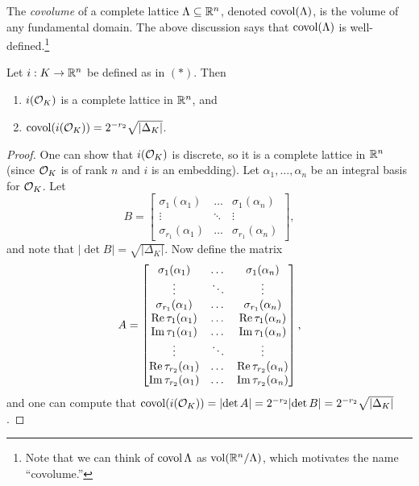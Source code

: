 \begin{definition}
  The \emph{covolume} of a complete lattice
  $\Lambda \subseteq \mathbb{R}^n$, denoted
  $\operatorname{covol}(\Lambda)$, is the volume of any fundamental
  domain. The above discussion says that $\operatorname{covol}(\Lambda)$
  is well-defined.\footnote{Note that we can think of $\operatorname{covol}{\Lambda}$ as $\operatorname{vol}(\mathbb{R}^n / \Lambda)$, which motivates the name ``covolume.''}
\end{definition}

\begin{theorem}
  Let $i : K \to \mathbb{R}^n$ be defined as in $(*)$. Then
  \begin{enumerate}
    \item $i(\mathcal{O}_K)$ is a complete lattice in $\mathbb{R}^n$, and
    \item $\operatorname{covol}(i(\mathcal{O}_K)) = 2^{-r_2} \sqrt{|\Delta_K|}$.
  \end{enumerate}
\end{theorem}

\begin{proof}
  One can show that $i(\mathcal{O}_K)$ is discrete, so
  it is a complete lattice in $\mathbb{R}^n$ (since $\mathcal{O}_K$ is
  of rank $n$ and $i$ is an embedding).
  Let $\alpha_1, \dots, \alpha_n$ be an integral
  basis for $\mathcal{O}_K$. Let
  \[
    B = \begin{bmatrix}
      \sigma_1(\alpha_1) & \dots & \sigma_1(\alpha_n) \\
      \vdots & \ddots & \vdots \\
      \sigma_{r_1}(\alpha_1) & \dots & \sigma_{r_1}(\alpha_n)
    \end{bmatrix},
  \]
  and note that $|{\det B}| = \sqrt{|\Delta_K|}$.
  Now define the matrix
  \[
    A = \begin{bmatrix}
      \sigma_1(\alpha_1) & \dots & \sigma_1(\alpha_n) \\
      \vdots & \ddots & \vdots \\
      \sigma_{r_1}(\alpha_1) & \dots & \sigma_{r_1}(\alpha_n) \\
      \operatorname{Re} \tau_{1}(\alpha_1) & \dots & \operatorname{Re} \tau_{1}(\alpha_n) \\
      \operatorname{Im} \tau_{1}(\alpha_1) & \dots & \operatorname{Im} \tau_{1}(\alpha_n) \\
      \vdots & \ddots & \vdots \\
      \operatorname{Re} \tau_{r_2}(\alpha_1) & \dots & \operatorname{Re} \tau_{r_2}(\alpha_n) \\
      \operatorname{Im} \tau_{r_2}(\alpha_1) & \dots & \operatorname{Im} \tau_{r_2}(\alpha_n)
    \end{bmatrix},
  \]
  and one can compute that $\operatorname{covol}(i(\mathcal{O}_K)) = |{\det A}| = 2^{-r_2} |{\det B}| = 2^{-r_2} \sqrt{|\Delta_K|}$.
\end{proof}

